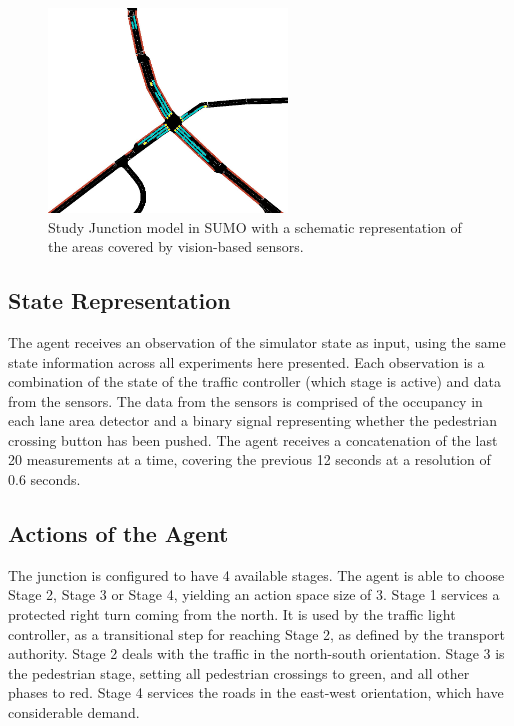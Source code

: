 \documentclass[sigconf,anonymous]{aamas}
\begin{document}
\begin{figure}                                                
\centering                                                    
\includegraphics[width=2.5in]{intersection}                                    
\caption{Study Junction model in SUMO with a schematic representation of the areas covered by vision-based sensors.}                                  
\label{intersection}                                               
\end{figure}     

\subsection{State Representation}
The agent receives an observation of the simulator state as input, using the same state information across all experiments here presented.
Each observation is a combination of the state of the traffic controller (which stage is active) and data from the sensors.
The data from the sensors is comprised of the occupancy in each lane area detector and a binary signal representing whether the pedestrian crossing button has been pushed.
The agent receives a concatenation of the last 20 measurements at a time, covering the previous 12 seconds at a resolution of 0.6 seconds.

\subsection{Actions of the Agent}
The junction is configured to have 4 available stages. 
The agent is able to choose Stage 2, Stage 3 or Stage 4, yielding an action space size of 3.
Stage 1 services a protected right turn coming from the north. It is used by the traffic light controller, as a transitional step for reaching Stage 2, as defined by the transport authority.
Stage 2 deals with the traffic in the north-south orientation.
Stage 3 is the pedestrian stage, setting all pedestrian crossings to green, and all other phases to red.
Stage 4 services the roads in the east-west orientation, which have considerable demand.
\end{document}
